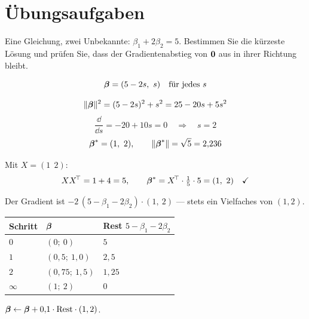 \section{Übungsaufgaben}

\begin{aufgabe}
Eine Gleichung, zwei Unbekannte: $\beta_1 + 2\beta_2 = 5$. Bestimmen Sie die kürzeste Lösung und prüfen Sie, dass der Gradientenabstieg von $\boldsymbol{0}$ aus in ihrer Richtung bleibt.

\loesung
{}
\[ \boldsymbol{\beta} = (5 - 2s,\ s) \quad\text{für jedes } s \]

\[ \|\boldsymbol{\beta}\|^{2} = (5-2s)^{2} + s^{2} = 25 - 20s + 5s^{2} \]
\[ \frac{\dd}{\dd s} = -20 + 10s = 0 \quad\Longrightarrow\quad s = 2 \]
\[ \boldsymbol{\beta}^{*} = (1,\ 2), \qquad \|\boldsymbol{\beta}^{*}\| = \sqrt5 = 2{,}236 \]

Mit $X = (1\ \ 2)$:
\[ XX^{\!\top} = 1+4 = 5, \qquad \boldsymbol{\beta}^{*} = X^{\!\top}\cdot\tfrac15\cdot5 = (1,\ 2) \quad \checkmark \]

Der Gradient ist $-2\,(5 - \beta_1 - 2\beta_2)\cdot(1,\ 2)$ --- stets ein Vielfaches von $(1,2)$.

\begin{center}
{\small
\renewcommand{\arraystretch}{1.46}
\begin{tabular}{@{}P{1.6cm}P{2.4cm}P{2.4cm}@{}}
\toprule
\textbf{Schritt} & $\boldsymbol{\beta}$ & \textbf{Rest} $5 - \beta_1 - 2\beta_2$\\
\midrule
$0$ & $(0;\ 0)$ & $5$\\
$1$ & $(0{,}5;\ 1{,}0)$ & $2{,}5$\\
$2$ & $(0{,}75;\ 1{,}5)$ & $1{,}25$\\
$\infty$ & $(1;\ 2)$ & $0$\\
\bottomrule
\end{tabular}}
\end{center}
 $\boldsymbol{\beta} \leftarrow \boldsymbol{\beta} + 0{,}1\cdot\text{Rest}\cdot(1,2)$.

\begin{center}
\begin{minipage}{0.88\textwidth}
\end{minipage}
\end{center}
\end{aufgabe}

